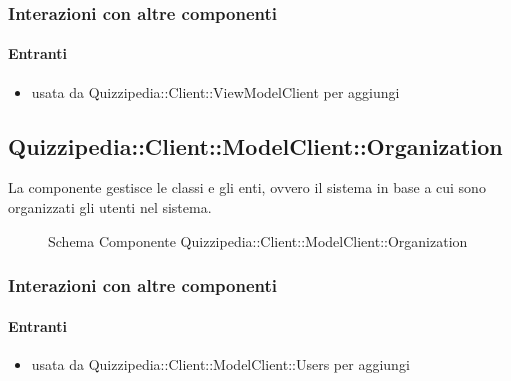 \subsubsection{Interazioni con altre componenti}
\paragraph{Entranti}
\begin{itemize}
\item usata da Quizzipedia::Client::ViewModelClient per aggiungi
\end{itemize}
\subsection{Quizzipedia::Client::ModelClient::Organization}
La componente gestisce le classi e gli enti, ovvero il sistema in base a cui sono organizzati gli utenti nel sistema.
\begin{figure}[H]
\centering
\noindent{}
\caption[Schema Componente Quizzipedia::Client::ModelClient::Organization]{Schema Componente Quizzipedia::Client::ModelClient::Organization}
\end{figure}
\subsubsection{Interazioni con altre componenti}
\paragraph{Entranti}
\begin{itemize}
\item usata da Quizzipedia::Client::ModelClient::Users per aggiungi
\end{itemize}
